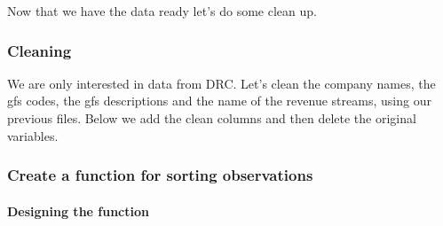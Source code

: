 \documentclass[]{article}
\newenvironment{Shaded}{\begin{snugshade}}{\end{snugshade}}
\newcommand{\DataTypeTok}[1]{\textcolor[rgb]{0.13,0.29,0.53}{#1}}
\newcommand{\KeywordTok}[1]{\textcolor[rgb]{0.13,0.29,0.53}{\textbf{#1}}}
\newcommand{\NormalTok}[1]{#1}
\newcommand{\OperatorTok}[1]{\textcolor[rgb]{0.81,0.36,0.00}{\textbf{#1}}}
\newcommand{\StringTok}[1]{\textcolor[rgb]{0.31,0.60,0.02}{#1}}
\let\oldparagraph\paragraph
\renewcommand{\paragraph}[1]{\oldparagraph{#1}\mbox{}}
\begin{document}
Now that we have the data ready let's do some clean up.

\hypertarget{cleaning}{%
\subsubsection{Cleaning}\label{cleaning}}

We are only interested in data from DRC. Let's clean the company names,
the gfs codes, the gfs descriptions and the name of the revenue streams,
using our previous files. Below we add the clean columns and then delete
the original variables.

\begin{Shaded}
\end{Shaded}

\hypertarget{create-a-function-for-sorting-observations}{%
\subsubsection{Create a function for sorting
observations}\label{create-a-function-for-sorting-observations}}

\hypertarget{designing-the-function}{%
\paragraph{Designing the function}\label{designing-the-function}}
\end{document}
